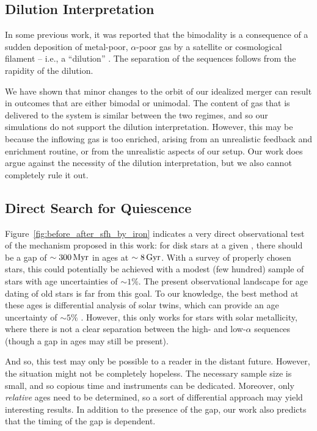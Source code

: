 \subsection{Dilution Interpretation}\label{ssec:dilute}
In some previous work, it was reported that the bimodality is a consequence of a sudden deposition of metal-poor, $\alpha$-poor gas by a satellite or cosmological filament -- i.e., a ``dilution'' \citep{2020MNRAS.491.5435B,}. The separation of the sequences follows from the rapidity of the dilution.

We have shown that minor changes to the orbit of our idealized merger can result in outcomes that are either bimodal or unimodal. The content of gas that is delivered to the system is similar between the two regimes, and so our simulations do not support the dilution interpretation. However, this may be because the inflowing gas is too enriched, arising from an unrealistic feedback and enrichment routine, or from the unrealistic aspects of our setup. Our work does argue against the necessity of the dilution interpretation, but we also cannot completely rule it out.

\subsection{Direct Search for Quiescence}\label{ssec:obsqui}
Figure~\ref{fig:before_after_sfh_by_iron} indicates a very direct observational test of the mechanism proposed in this work: for disk stars at a given \FeH{}, there should be a gap of $\sim300\,\textrm{Myr}$ in ages at $\sim8\,\textrm{Gyr}$. With a survey of properly chosen stars, this could potentially be achieved with a modest (few hundred) sample of stars with age uncertainties of $\sim1\%$. The present observational landscape for age dating of old stars is far from this goal. To our knowledge, the best method at these ages is differential analysis of solar twins, which can provide an age uncertainty of $\sim5\%$ \citep[e.g.][]{2014ApJ...795...23B,2018MNRAS.474.2580S}. However, this only works for stars with solar metallicity, where there is not a clear separation between the high- and low-$\alpha$ sequences (though a gap in ages may still be present). 

And so, this test may only be possible to a reader in the distant future. However, the situation might not be completely hopeless. The necessary sample size is small, and so copious time and instruments can be dedicated. Moreover, only \textit{relative} ages need to be determined, so a sort of differential approach may yield interesting results. In addition to the presence of the gap, our work also predicts that the timing of the gap is \FeH{} dependent.


